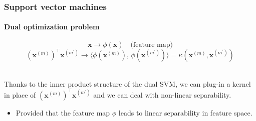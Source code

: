 \documentclass[aspectratio=43]{beamer}
\newcommand{\inner}[2]{\langle #1,\, #2\rangle}
\newcommand{\kernel}[2]{\kappa\left( #1, #2 \right)}
\begin{document}
\begin{frame}
  \frametitle{Support vector machines}
  \framesubtitle{Dual optimization problem}
  
  \[\mathbf{x} \rightarrow \phi\left( \mathbf{x} \right) \quad \text{(feature map)}\]
  \pause
  \[\left( \mathbf{x}^{(m)} \right)^\top \mathbf{x}^{(m^\prime)} \rightarrow \inner{\phi\left( \mathbf{x}^{(m)} \right)}{\phi\left( \mathbf{x}^{(m^\prime)} \right)} = \kernel{\mathbf{x}^{(m)}}{\mathbf{x}^{(m^\prime)}}\]

  \ \\
  \pause
  Thanks to the inner product structure of the dual SVM, we can plug-in a kernel in place of $\left( \mathbf{x}^{(m)} \right)^\top \mathbf{x}^{(m^\prime)}$ and we can deal with non-linear separability.
  \begin{itemize}
    \item<4-> Provided that the feature map $\phi$ leads to linear separability in feature space.
  \end{itemize}
  

\end{frame}


\end{document}
